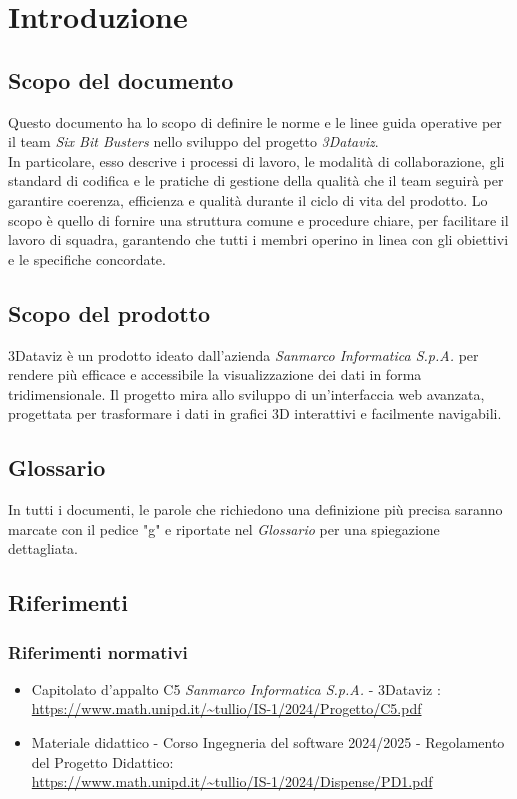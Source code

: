 \section{Introduzione}
    \subsection{Scopo del documento}
        Questo documento ha lo scopo di definire le norme e le linee guida operative
        per il team \textit{Six Bit Busters} nello sviluppo del progetto
        \textit{3Dataviz}.\\ In particolare, esso descrive i processi di lavoro,
        le modalità di collaborazione, gli standard di codifica e le pratiche
        di gestione della qualità che il team seguirà per garantire coerenza, 
        efficienza e qualità durante il ciclo di vita del prodotto. 
        Lo scopo è quello di fornire una struttura comune e procedure chiare, per 
        facilitare il lavoro di squadra, garantendo che tutti i membri operino in 
        linea con gli obiettivi e le specifiche concordate.

    \subsection{Scopo del prodotto}

   3Dataviz è un prodotto ideato dall'azienda \textit{Sanmarco Informatica S.p.A.} per rendere più efficace e accessibile la visualizzazione dei dati in forma tridimensionale. Il progetto mira allo sviluppo di un’interfaccia web avanzata, progettata per trasformare i dati in grafici 3D interattivi e facilmente navigabili.
        
    \subsection{Glossario}
      In tutti i documenti, le parole che richiedono una definizione più precisa saranno marcate con il pedice "g" e riportate nel \textit{Glossario} per una spiegazione dettagliata.
        
    \subsection{Riferimenti}
        \subsubsection{Riferimenti normativi}
        \begin{itemize}
            \item Capitolato d'appalto C5 \textit{Sanmarco Informatica S.p.A.} - 3Dataviz : \\ \url{https://www.math.unipd.it/~tullio/IS-1/2024/Progetto/C5.pdf}
            \item Materiale didattico - Corso Ingegneria del software 2024/2025 - Regolamento del Progetto Didattico: \\ \url{https://www.math.unipd.it/~tullio/IS-1/2024/Dispense/PD1.pdf}
        \end{itemize}
